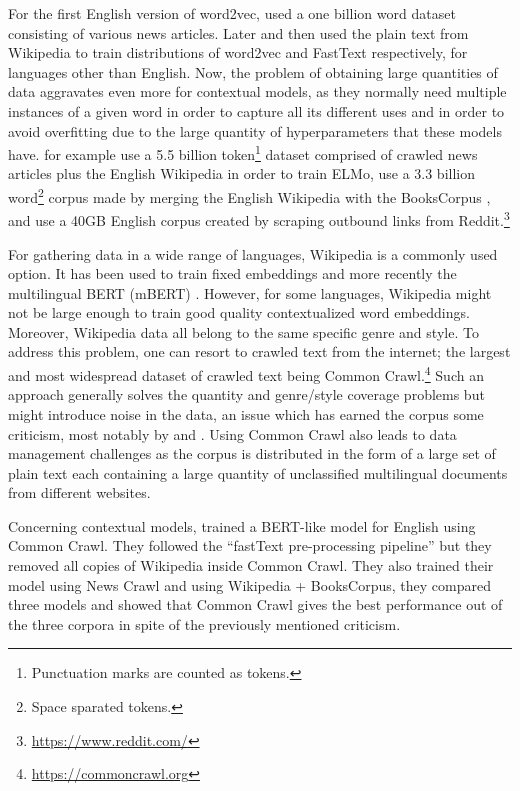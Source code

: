 For the first English version of word2vec, \citet{mikolov-etal-2013-distributed} used a one billion word dataset consisting of various news articles. Later \citet{al-rfou-etal-2013-polyglot} and then \citet{bojanowski-etal-2017-enriching} used the plain text from Wikipedia to train distributions of word2vec and FastText respectively, for languages other than English. Now, the problem of obtaining large quantities of data aggravates even more for contextual models, as they normally need multiple instances of a given word in order to capture all its different uses and in order to avoid overfitting due to the large quantity of hyperparameters that these models have. \citet{peters-etal-2018-deep} for example use a 5.5 billion token\footnote{Punctuation marks are counted as tokens.} dataset comprised of crawled news articles plus the English Wikipedia in order to train ELMo, \citet{devlin-etal-2019-bert} use a 3.3 billion word\footnote{Space sparated tokens.} corpus made by merging the English Wikipedia with the BooksCorpus \citep{zhu-etal-2015-aligning}, and \citet{radford-etal-2019-language} use a 40GB English corpus created by scraping outbound links from Reddit.\footnote{\url{https://www.reddit.com/}}

For gathering data in a wide range of languages, Wikipedia is a commonly used option. It has been used to train fixed embeddings \citep{al-rfou-etal-2013-polyglot,bojanowski-etal-2017-enriching} and more recently the multilingual BERT (mBERT) \citep{devlin-etal-2019-bert}. However, for some languages, Wikipedia might not be large enough to train good quality contextualized word embeddings. Moreover, Wikipedia data all belong to the same specific genre and style. To address this problem, one can resort to crawled text from the internet; the largest and most widespread dataset of crawled text being Common Crawl.\footnote{\url{https://commoncrawl.org}} Such an approach generally solves the quantity and genre/style coverage problems but might introduce noise in the data, an issue which has earned the corpus some criticism, most notably by \citet{trinh-le-2018-a} and \citet{radford-etal-2019-language}. Using Common Crawl also leads to data management challenges as the corpus is distributed in the form of a large set of plain text each containing a large quantity of unclassified multilingual documents from different websites.

Concerning contextual models, \citet{baevski-etal-2019-cloze} trained a BERT-like model for English using Common Crawl. They followed the ``fastText pre-processing pipeline'' but they removed all copies of Wikipedia inside Common Crawl. They also trained their model using News Crawl \citep{bojar-etal-2018-findings} and using Wikipedia + BooksCorpus, they compared three models and showed that Common Crawl gives the best performance out of the three corpora in spite of the previously mentioned criticism.

